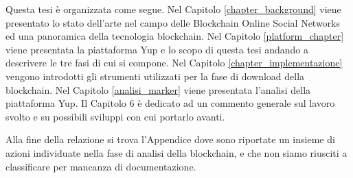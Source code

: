Questa tesi è organizzata come segue. Nel Capitolo \ref{chapter_background} viene presentato lo stato dell'arte nel campo delle Blockchain Online Social Networks ed una panoramica della tecnologia blockchain. Nel Capitolo \ref{platform_chapter} viene presentata la piattaforma Yup e lo scopo di questa tesi andando a descrivere le tre fasi di cui si compone. Nel Capitolo \ref{chapter_implementazione} vengono introdotti gli strumenti utilizzati per la fase di download della blockchain. Nel Capitolo \ref{analisi_marker} viene presentata l'analisi della piattaforma Yup. Il Capitolo 6 è dedicato ad un commento generale sul lavoro svolto e su possibili sviluppi con cui portarlo avanti.

Alla fine della relazione si trova l’Appendice dove sono riportate un insieme di azioni individuate nella fase di analisi della blockchain, e che non siamo riusciti a classificare per mancanza di documentazione.



